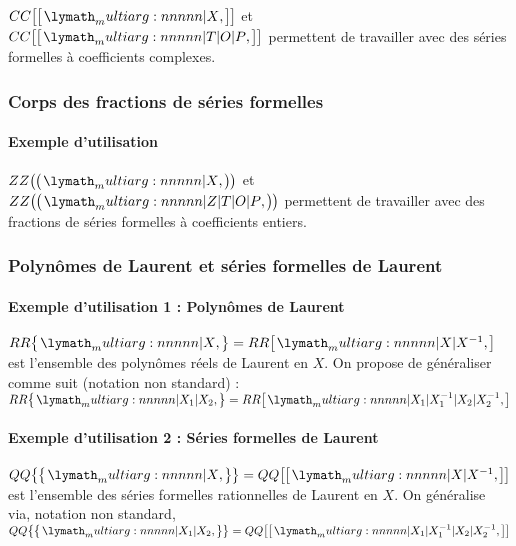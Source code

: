 \documentclass[12pt,a4paper]{article}
\newcommand\ZZ{ZZ}
\newcommand\QQ{QQ}
\newcommand\RR{RR}
\newcommand\CC{CC}
\begin{document}
\begin{tcblisting}{}
$\serieset{\CC}{X}$ et $\serieset{\CC}{T | O | P}$ permettent de travailler avec des
séries formelles à coefficients complexes.
\end{tcblisting}



        \subsubsection{Corps des fractions de séries formelles}

            \paragraph{Exemple d'utilisation}

\begin{tcblisting}{}
$\seriefracset{\ZZ}{X}$ et $\seriefracset{\ZZ}{Z | T | O | P}$ permettent de travailler
avec des fractions de séries formelles à coefficients entiers.
\end{tcblisting}



        \subsubsection{Polynômes de Laurent et séries formelles de Laurent}

            \paragraph{Exemple d'utilisation 1 : Polynômes de Laurent}

\begin{tcblisting}{}
$\polylaurentset{\RR}{X} = \polyset{\RR}{X | X^{-1}}$ est l'ensemble des polynômes
réels de Laurent en $X$. On propose de généraliser comme suit (notation non standard) :
$\polylaurentset{\RR}{X_1 | X_2} = \polyset{\RR}{X_1 | X_1^{-1} | X_2 | X_2^{-1}}$
\end{tcblisting}



            \paragraph{Exemple d'utilisation 2 : Séries formelles de Laurent}

\begin{tcblisting}{}
$\serielaurentset{\QQ}{X} = \serieset{\QQ}{X | X^{-1}}$ est l'ensemble des séries 
formelles rationnelles de Laurent en $X$. On généralise via, notation non standard,
$\serielaurentset{\QQ}{X_1 | X_2} = \serieset{\QQ}{X_1 | X_1^{-1} | X_2 | X_2^{-1}}$
\end{tcblisting}
\end{document}
